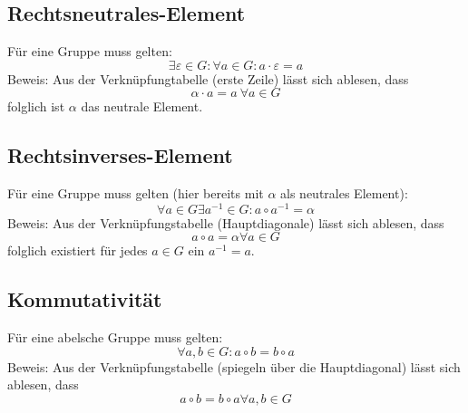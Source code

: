 \documentclass[DIN, pagenumber=false, fontsize=11pt, parskip=half]{scrartcl}
\begin{document}
    \subsection{Rechtsneutrales-Element}
    Für eine Gruppe muss gelten:
    \begin{equation}
        \exists \varepsilon \in G: \forall a \in G: a \cdot \varepsilon = a
    \end{equation}
    Beweis: Aus der Verknüpfungtabelle (erste Zeile) lässt sich ablesen, dass
    \begin{equation}
        \alpha \cdot a = a\ \forall a \in G
    \end{equation}
    folglich ist $\alpha$ das neutrale Element.

    \subsection{Rechtsinverses-Element}
    Für eine Gruppe muss gelten (hier bereits mit $\alpha$ als neutrales Element):
    \begin{equation}
        \forall a \in G \exists a^{-1} \in G: a \circ a^{-1} = \alpha
    \end{equation}
    Beweis: Aus der Verknüpfungstabelle (Hauptdiagonale) lässt sich ablesen, dass 
    \begin{equation}
        a \circ a = \alpha \forall a \in G
    \end{equation}
    folglich existiert für jedes $a \in G$ ein $a^{-1} = a$.

    \subsection{Kommutativität}
    Für eine abelsche Gruppe muss gelten:
    \begin{equation}
        \forall a, b \in G: a \circ b = b \circ a
    \end{equation}    
    Beweis: Aus der Verknüpfungstabelle (spiegeln über die Hauptdiagonal) lässt sich
    ablesen, dass
    \begin{equation}
        a \circ b = b \circ a \forall a, b \in G
    \end{equation}
\end{document}
